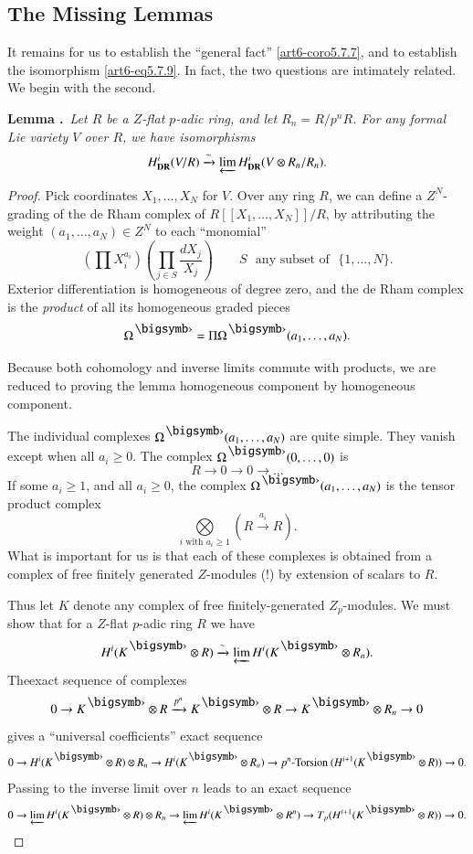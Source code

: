 \subsection{The Missing Lemmas}\label{art6-sec5.8}\pageoriginale
It remains for us to establish the ``general fact'' \eqref{art6-coro5.7.7}, and to establish the isomorphism \eqref{art6-eq5.7.9}. In fact, the two questions are intimately related. We begin with the second.

\medskip
\noindent
{\bf Lemma .\label{art6-lem5.8.1}}~{\em Let $R$ be a $Z$-flat $p$-adic ring, and let $R_{n}=R/p^{n}R$. For any formal Lie variety $V$ over $R$, we have isomorphisms}
$$
H^{i}_{\mathbf{DR}}(V/R)\xrightarrow{\sim}\varprojlim H^{i}_{\mathbf{DR}}(V\otimes R_{n}/R_{n}).
$$

\begin{proof}
Pick coordinates $X_{1},\ldots,X_{N}$ for $V$. Over any ring $R$, we can define a $Z^{N}$-grading of the de Rham complex of $R[[X_{1},\ldots,X_{N}]]/R$, by attributing the weight $(a_{1},\ldots,a_{N})\in Z^{N}$ to each ``monomial''
$$
\left(\prod X^{a_{i}}_{i}\right)\left(\prod\limits_{j\in S}\frac{dX_{j}}{X_{j}}\right)\qquad S\text{~ any subset of~ }\{1,\ldots,N\}.
$$
Exterior differentiation is homogeneous of degree zero, and the de Rham complex is the {\em product} of all its homogeneous graded pieces
$$
\Omega^{\bigdot}=\Pi \Omega^{\bigdot}(a_{1},\ldots,a_{N}).
$$

Because both cohomology and inverse limits commute with products, we are reduced to proving the lemma homogeneous component by homogeneous component.

The individual complexes $\Omega^{\bigdot}(a_{1},\ldots,a_{N})$ are quite simple. They vanish except when all $a_{i}\geq 0$. The complex $\Omega^{\bigdot}(0,\ldots,0)$ is
$$
R\to 0\to 0\to \ldots
$$
If some $a_{i}\geq 1$, and all $a_{i}\geq 0$, the complex $\Omega^{\bigdot}(a_{1},\ldots,a_{N})$ is the tensor product complex
$$
\bigotimes\limits_{i\text{~with~}a_{i}\geq 1}\left(R\xrightarrow{a_{i}}R\right).
$$
What is important for us is that each of these complexes is obtained from a complex of free finitely generated $Z$-modules (!) by extension of scalars to $R$.

Thus let $K$ denote any complex of free finitely-generated $Z_{p}$-modules. We must show that for a $Z$-flat $p$-adic ring $R$ we have
$$
H^{i}(K^{\bigdot}\otimes R)\xrightarrow{\sim}\varprojlim H^{i}(K^{\bigdot}\otimes R_{n}).
$$
The\pageoriginale exact sequence of complexes
$$
0\to K^{\bigdot}\otimes R\xrightarrow{p^{n}} K^{\bigdot}\otimes R\to K^{\bigdot}\otimes R_{n}\to 0
$$
gives a ``universal coefficients'' exact sequence
$$
0\to H^{i}(K^{\bigdot}\otimes R)\otimes R_{n}\to H^{i}(K^{\bigdot}\otimes R_{n})\to p^{n}\text{-Torsion~}(H^{i+1}(K^{\bigdot}\otimes R))\to 0.
$$
Passing to the inverse limit over $n$ leads to an exact sequence
$$
0\to \varprojlim H^{i}(K^{\bigdot}\otimes R)\otimes R_{n}\to \varprojlim H^{i}(K^{\bigdot}\otimes R^{n})\to T_{p}(H^{i+1}(K^{\bigdot}\otimes R))\to 0.
$$


\end{proof}
